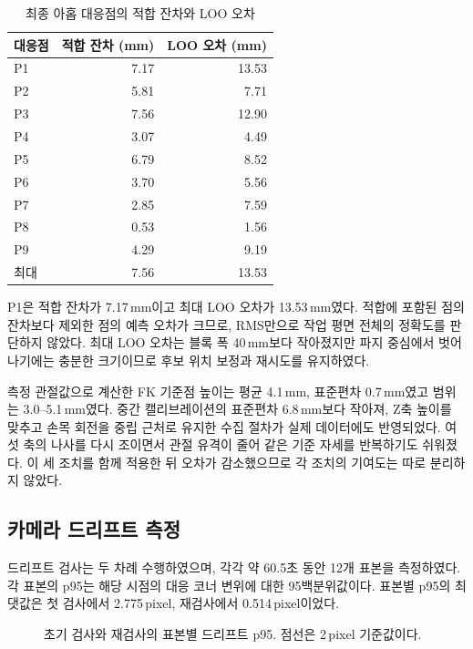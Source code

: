 \begin{table}[htbp]
\centering
\caption{최종 아홉 대응점의 적합 잔차와 LOO 오차}\label{tab:calibration}
\begin{tabular}{@{}lrr@{}}
\toprule 대응점 & 적합 잔차 (mm) & LOO 오차 (mm) \\
\midrule
P1 & 7.17 & 13.53 \\
P2 & 5.81 & 7.71 \\
P3 & 7.56 & 12.90 \\
P4 & 3.07 & 4.49 \\
P5 & 6.79 & 8.52 \\
P6 & 3.70 & 5.56 \\
P7 & 2.85 & 7.59 \\
P8 & 0.53 & 1.56 \\
P9 & 4.29 & 9.19 \\
\midrule
최대 & 7.56 & 13.53 \\
\bottomrule
\end{tabular}
\end{table}

P1은 적합 잔차가 7.17\,mm이고 최대 LOO 오차가 13.53\,mm였다. 적합에 포함된 점의 잔차보다 제외한 점의 예측 오차가 크므로, RMS만으로 작업 평면 전체의 정확도를 판단하지 않았다. 최대 LOO 오차는 블록 폭 40\,mm보다 작아졌지만 파지 중심에서 벗어나기에는 충분한 크기이므로 후보 위치 보정과 재시도를 유지하였다.

측정 관절값으로 계산한 FK 기준점 높이는 평균 4.1\,mm, 표준편차 0.7\,mm였고 범위는 3.0--5.1\,mm였다. 중간 캘리브레이션의 표준편차 6.8\,mm보다 작아져, Z축 높이를 맞추고 손목 회전을 중립 근처로 유지한 수집 절차가 실제 데이터에도 반영되었다. 여섯 축의 나사를 다시 조이면서 관절 유격이 줄어 같은 기준 자세를 반복하기도 쉬워졌다. 이 세 조치를 함께 적용한 뒤 오차가 감소했으므로 각 조치의 기여도는 따로 분리하지 않았다.

\subsection{카메라 드리프트 측정}
드리프트 검사는 두 차례 수행하였으며, 각각 약 60.5초 동안 12개 표본을 측정하였다. 각 표본의 p95는 해당 시점의 대응 코너 변위에 대한 95백분위값이다. 표본별 p95의 최댓값은 첫 검사에서 2.775\,pixel, 재검사에서 0.514\,pixel이었다.

\begin{figure}[htbp]
\centering
{}
\caption{초기 검사와 재검사의 표본별 드리프트 p95. 점선은 2\,pixel 기준값이다.}
\label{fig:drift}
\end{figure}


